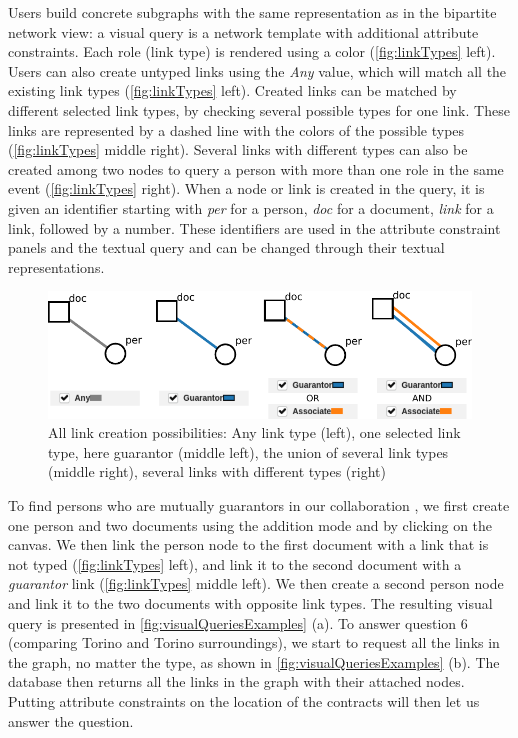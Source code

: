 Users build concrete subgraphs with the same representation as in the bipartite network view: a visual query is a network template with additional attribute constraints.
Each role (link type) is rendered using a color (\autoref{fig:linkTypes} left).
Users can also create untyped links using the \textit{Any} value, which will match all the existing link types (\autoref{fig:linkTypes} left).
Created links can be matched by different selected link types, by checking several possible types for one link.
These links are represented by a dashed line with the colors of the possible types (\autoref{fig:linkTypes} middle right).
Several links with different types can also be created among two nodes to query a person with more than one role in the same event (\autoref{fig:linkTypes} right).
When a node or link is created in the query, it is given an identifier starting with \emph{per} for a person, \emph{doc} for a document, \emph{link} for a link, followed by a number.
These identifiers are used in the attribute constraint panels and the textual query and can be changed through their textual representations.


\begin{figure}[!ht]
    \centering
    \includegraphics[width=0.9\linewidth]{static/figures/ComBiNet/OriginalPaperFigures/CGF/links.pdf}
    \caption{All link creation possibilities: Any link type (left), one selected link type, here guarantor (middle left), the union of several link types (middle right), several links with different types (right)}\label{fig:linkTypes}
\end{figure}

To find persons who are mutually guarantors in our collaboration \pascal, we first create one person and two documents using the addition mode and by clicking on the canvas.
We then link the person node to the first document with a link that is not typed (\autoref{fig:linkTypes} left), and link it to the second document with a \textit{guarantor} link (\autoref{fig:linkTypes} middle left).
We then create a second person node and link it to the two documents with opposite link types.
The resulting visual query is presented in \autoref{fig:visualQueriesExamples} (a).
To answer question 6 (comparing Torino and Torino surroundings), we start to request all the links in the graph, no matter the type, as shown in \autoref{fig:visualQueriesExamples} (b).
The database then returns all the links in the graph with their attached nodes.
Putting attribute constraints on the location of the contracts will then let us answer the question.



